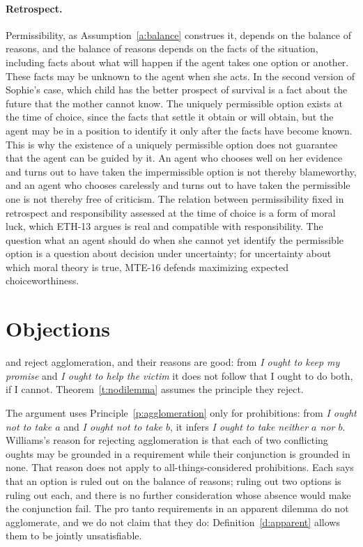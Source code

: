 \documentclass{situationist-preprint}
\begin{document}
\paragraph{Retrospect.} Permissibility, as Assumption~\ref{a:balance} construes it, depends on the balance of reasons, and the balance of reasons depends on the facts of the situation, including facts about what will happen if the agent takes one option or another. These facts may be unknown to the agent when she acts. In the second version of Sophie's case, which child has the better prospect of survival is a fact about the future that the mother cannot know. The uniquely permissible option exists at the time of choice, since the facts that settle it obtain or will obtain, but the agent may be in a position to identify it only after the facts have become known. This is why the existence of a uniquely permissible option does not guarantee that the agent can be guided by it. An agent who chooses well on her evidence and turns out to have taken the impermissible option is not thereby blameworthy, and an agent who chooses carelessly and turns out to have taken the permissible one is not thereby free of criticism. The relation between permissibility fixed in retrospect and responsibility assessed at the time of choice is a form of moral luck, which ETH-13 argues is real and compatible with responsibility. The question what an agent should do when she cannot yet identify the permissible option is a question about decision under uncertainty; for uncertainty about which moral theory is true, MTE-16 defends maximizing expected choiceworthiness.

\section{Objections}\label{s:objections}

\begin{objection}[Agglomeration]
\citet{Williams1965} and \citet{vanFraassen1973} reject agglomeration, and their reasons are good: from \emph{I ought to keep my promise} and \emph{I ought to help the victim} it does not follow that I ought to do both, if I cannot. Theorem~\ref{t:nodilemma} assumes the principle they reject.
\end{objection}

\begin{reply}
The argument uses Principle~\ref{p:agglomeration} only for prohibitions: from \emph{I ought not to take $a$} and \emph{I ought not to take $b$}, it infers \emph{I ought to take neither $a$ nor $b$}. Williams's reason for rejecting agglomeration is that each of two conflicting oughts may be grounded in a requirement while their conjunction is grounded in none. That reason does not apply to all-things-considered prohibitions. Each says that an option is ruled out on the balance of reasons; ruling out two options is ruling out each, and there is no further consideration whose absence would make the conjunction fail. The pro tanto requirements in an apparent dilemma do not agglomerate, and we do not claim that they do: Definition~\ref{d:apparent} allows them to be jointly unsatisfiable.
\end{reply}
\end{document}
